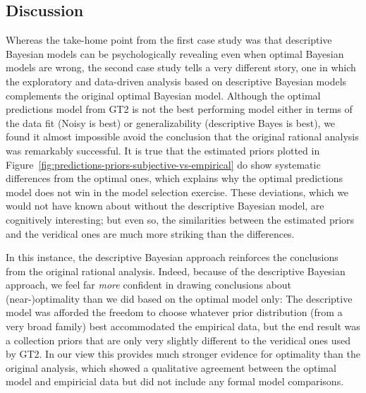 \subsection*{Discussion}

Whereas the take-home point from the first case study was that descriptive Bayesian models can be psychologically revealing even when optimal Bayesian models are wrong, the second case study tells a very different story, one in which the exploratory and data-driven analysis based on descriptive Bayesian models complements the original optimal Bayesian model.  Although the optimal predictions model from GT2 is not the best performing model either in terms of the data fit (Noisy \mink is best) or generalizability (descriptive Bayes is best), we found it almost impossible avoid the conclusion that the original rational analysis was remarkably successful.  It is true that the estimated priors plotted in Figure~\ref{fig:predictions-priors-subjective-vs-empirical} do show systematic differences from the optimal ones, which explains why the optimal predictions model does not win in the model selection exercise. These deviations, which we would not have known about without the descriptive Bayesian model, are cognitively interesting; but even so, the similarities between the estimated priors and the veridical ones are much more striking than the differences. 

In this instance, the descriptive Bayesian approach reinforces the conclusions from the original rational analysis. Indeed, because of the descriptive Bayesian approach, we feel far {\it more} confident in drawing conclusions about (near-)optimality than we did based on the optimal model only: The descriptive model was afforded the freedom to choose whatever prior distribution (from a very broad family) best accommodated the empirical data, but the end result was a collection priors that are only very slightly different to the veridical ones used by GT2. In our view this provides much stronger evidence for optimality than the original analysis, which showed a qualitative agreement between the optimal model and empiricial data but did not include any formal model comparisons.

